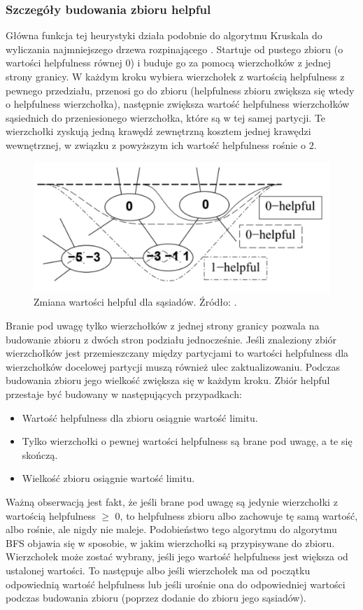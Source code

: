 \subsubsection{Szczegóły budowania zbioru helpful}
Główna funkcja tej heurystyki działa podobnie do algorytmu Kruskala do wyliczania
najmniejszego drzewa rozpinającego \cite{algorithms222}.
Startuje od pustego zbioru (o wartości helpfulness równej $0$) i buduje go za pomocą wierzchołków z jednej strony granicy.
W każdym kroku wybiera wierzchołek z wartością helpfulness z pewnego przedziału, przenosi go do zbioru
(helpfulness zbioru zwiększa się wtedy o helpfulness wierzchołka), następnie zwiększa wartość helpfulness wierzchołków
sąsiednich do przeniesionego wierzchołka, które są w tej samej partycji.
Te wierzchołki zyskują jedną krawędź zewnętrzną
kosztem jednej krawędzi wewnętrznej, w związku z powyższym ich wartość helpfulness rośnie o $2$.
\begin{figure}[h]
    \centering
    \includegraphics[width=0.6\linewidth]{images/changing_helpful_values}
    \caption{Zmiana wartości helpful dla sąsiadów.
    Źródło: \cite{article}.}
    \label{im:helpfulness_neighbours}
\end{figure}

Branie pod uwagę tylko wierzchołków z jednej strony granicy pozwala na budowanie zbioru z dwóch stron podziału jednocześnie.
Jeśli znaleziony zbiór wierzchołków jest przemieszczany między partycjami to wartości helpfulness dla wierzchołków
docelowej partycji muszą również ulec zaktualizowaniu.
Podczas budowania zbioru jego wielkość zwiększa się w każdym kroku.
Zbiór helpful przestaje być budowany w następujących przypadkach:
\begin{itemize}
    \item Wartość helpfulness dla zbioru osiągnie wartość limitu.
    \item {Tylko wierzchołki o pewnej wartości helpfulness są brane pod uwagę, a te się skończą.}
    \item Wielkość zbioru osiągnie wartość limitu.
\end{itemize}
Ważną obserwacją jest fakt, że jeśli brane pod uwagę są jedynie wierzchołki z wartością helpfulness $\geq$ $0$,
to helpfulness zbioru albo zachowuje tę samą wartość, albo rośnie, ale nigdy nie maleje.
Podobieństwo tego algorytmu do algorytmu BFS objawia się w sposobie, w jakim wierzchołki są przypisywane do zbioru.
Wierzchołek może zostać wybrany, jeśli jego wartość helpfulness jest większa od ustalonej wartości.
To następuje albo jeśli wierzchołek ma od początku odpowiednią wartość helpfulness lub jeśli urośnie ona do odpowiedniej
wartości podczas budowania zbioru (poprzez dodanie do zbioru jego sąsiadów).

